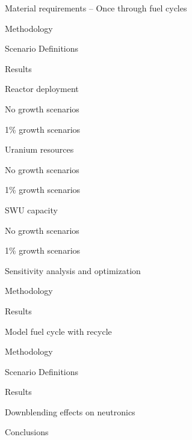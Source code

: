 \documentclass{report}
\begin{document}
\begin{outline}
\item Material requirements -- Once through fuel cycles
\begin{outline}
    \item Methodology
    \item Scenario Definitions
    \item Results
    \begin{outline}
        \item Reactor deployment
        \begin{outline}
            \item No growth scenarios
            \item 1\% growth scenarios
        \end{outline}
        \item Uranium resources
        \item \begin{outline}
            \item No growth scenarios
            \item 1\% growth scenarios
        \end{outline}
        \item SWU capacity
        \item \begin{outline}
            \item No growth scenarios
            \item 1\% growth scenarios
        \end{outline}
    \end{outline}
\end{outline}
\begin{outline}
    \item Sensitivity analysis and optimization
    \item \begin{outline}
        \item Methodology
        \item Results
    \end{outline}
\end{outline}


\item Model fuel cycle with recycle 
\begin{outline}
    \item Methodology
    \item Scenario Definitions
    \item Results
\end{outline}

\item Downblending effects on neutronics

\item Conclusions
\end{outline}




\end{document}
